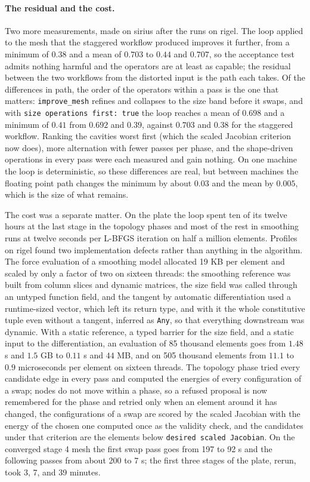 \documentclass[11pt]{article}
\newcommand{\code}[1]{\texttt{#1}}
\begin{document}
\paragraph{The residual and the cost.} Two more measurements, made
on sirius after the runs on rigel. The loop applied to the mesh that the
staggered workflow produced improves it further, from a minimum of
$0.38$ and a mean of $0.703$ to $0.44$ and $0.707$, so the acceptance
test admits nothing harmful and the operators are at least as capable;
the residual between the two workflows from the distorted input is the
path each takes. Of the differences in path, the order of the operators
within a pass is the one that matters: \code{improve\_mesh} refines and
collapses to the size band before it swaps, and with
\code{size operations first: true} the loop reaches a mean of $0.698$
and a minimum of $0.41$ from $0.692$ and $0.39$, against $0.703$ and
$0.38$ for the staggered workflow. Ranking the cavities worst first
(which the scaled Jacobian criterion now does), more alternation with
fewer passes per phase, and the shape-driven operations in every pass
were each measured and gain nothing. On one machine the loop is
deterministic, so these differences are real, but between machines the
floating point path changes the minimum by about $0.03$ and the mean by
$0.005$, which is the size of what remains.

The cost was a separate matter. On the plate the loop spent ten of its
twelve hours at the last stage in the topology phases and most of the
rest in smoothing runs at twelve seconds per L-BFGS iteration on half a
million elements. Profiles on rigel found two implementation defects
rather than anything in the algorithm. The force evaluation of a
smoothing model allocated 19 KB per element and scaled by only a factor
of two on sixteen threads: the smoothing reference was built from column
slices and dynamic matrices, the size field was called through an
untyped function field, and the tangent by automatic differentiation
used a runtime-sized vector, which left its return type, and with it the
whole constitutive tuple even without a tangent, inferred as \code{Any},
so that everything downstream was dynamic. With a static reference, a
typed barrier for the size field, and a static input to the
differentiation, an evaluation of 85 thousand elements goes from $1.48$
s and $1.5$ GB to $0.11$ s and $44$ MB, and on 505 thousand elements
from $11.1$ to $0.9$ microseconds per element on sixteen threads. The
topology phase tried every candidate edge in every pass and computed the
energies of every configuration of a swap; nodes do not move within a
phase, so a refused proposal is now remembered for the phase and retried
only when an element around it has changed, the configurations of a
swap are scored by the scaled Jacobian with the energy of the chosen one
computed once as the validity check, and the candidates under that
criterion are the elements below \code{desired scaled Jacobian}. On the
converged stage 4 mesh the first swap pass goes from 197 to 92 s and the
following passes from about 200 to 7 s; the first three stages of the
plate, rerun, took 3, 7, and 39 minutes.
\end{document}

